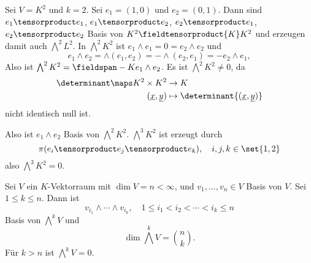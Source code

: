 \begin{beispiel*}
  Sei \( V=K^2 \) und \( k=2 \). Sei \( e_1=(1,0) \) und \( e_2=(0,1) \). Dann sind \( e_1\tensorproduct e_1 \), \( e_1\tensorproduct e_2 \), \( e_2\tensorproduct e_1 \), \( e_2\tensorproduct e_2 \) Basis von \( K^2\fieldtensorproduct{K}K^2 \) und erzeugen damit auch \( \bigwedge^2 L^2 \). In \( \bigwedge^2 K^2 \) ist \( e_1\wedge e_1=0=e_2\wedge e_2 \) und
  \begin{equation*}
    e_1\wedge e_2=\wedge(e_1,e_2)=-\wedge(e_2,e_1)=-e_2\wedge e_1,
  \end{equation*}
  Also ist \( \bigwedge^2 K^2=\fieldspan-{K}{e_1\wedge e_2} \). Es ist \( \bigwedge^2K^2\neq 0 \), da \zb 
  \begin{align*}
    \determinant\maps K^2\times K^2&\to K\\
    (\underline{x},\underline{y})&\mapsto \determinant{(\underline{x},\underline{y})}
  \end{align*}
  nicht identisch null ist.

  Also ist \( e_1\wedge e_2 \) Basis von \( \bigwedge^2 K^2 \). \( \bigwedge^3 K^2 \) ist erzeugt durch
  \begin{equation*}
    \pi(e_i\tensorproduct e_j \tensorproduct e_k),\quad i,j,k\in \set{1,2}
  \end{equation*}
  also \( \bigwedge^3K^2=0 \).
\end{beispiel*}
\begin{satz}
  Sei \( V \) ein \( K \)-Vektorraum mit \( \dim{V}=n<\infty \), und \( v_1,\dotsc,v_n\in V \) Basis von \( V \). Sei \( 1\leq k \leq n\). Dann ist
  \begin{equation*}
    v_{i_1}\wedge \dotsb \wedge v_{i_k},\quad 1\leq i_1<i_2<\dotsb<i_k\leq n
  \end{equation*}
  Basis von \( \bigwedge^k V \) und 
  \begin{equation*}
    \dim{\bigwedge^k V}=\binom{n}{k}.
  \end{equation*}
  Für \( k>n \) ist \( \bigwedge^k V=0 \).
\end{satz}
